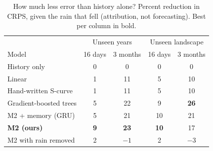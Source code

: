 \begin{table}[t]\centering\small\setlength{\tabcolsep}{4pt}
\caption{How much less error than history alone? Percent reduction in CRPS, given the rain that fell (attribution, not forecasting). Best per column in bold.}\label{tab:skill}
\begin{tabular}{lcccc}\toprule
 & \multicolumn{2}{c}{Unseen years} & \multicolumn{2}{c}{Unseen landscape}\\
Model & 16 days & 3 months & 16 days & 3 months\\\midrule
History only & 0 & 0 & 0 & 0\\
Linear & 1 & 11 & 5 & 10\\
Hand-written S-curve & 1 & 11 & 5 & 10\\
Gradient-boosted trees & 5 & 22 & 9 & \textbf{26}\\
M2 + memory (GRU) & 5 & 21 & 10 & 21\\
\textbf{M2 (ours)} & \textbf{9} & \textbf{23} & \textbf{10} & 17\\\midrule
M2 with rain removed & 2 & $-1$ & 2 & $-3$\\\bottomrule
\end{tabular}
\end{table}
